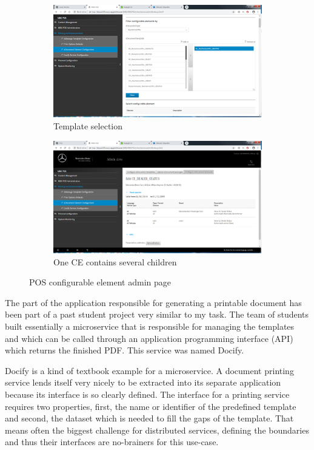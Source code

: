 \begin{figure}
  \begin{subfigure}[b]{0.5\linewidth}
    \includegraphics[width=\linewidth]{assets/pos-ce-config-1.png}
    \caption{Template selection}
    \label{fig:pos:a}
  \end{subfigure}
  \begin{subfigure}[b]{0.5\linewidth}
    \includegraphics[width=\linewidth]{assets/pos-ce-config-3.png}
    \caption{One CE contains several children}
    \label{fig:pos:b}
  \end{subfigure}
  \caption{POS configurable element admin page}
  \label{fig:pos}
\end{figure}

The part of the application responsible for generating a printable document has been part of a past student project very similar to my task. The team of students built essentially a microservice that is responsible for managing the templates and which can be called through an application programming interface (API) which returns the finished PDF. This service was named Docify.

Docify is a kind of textbook example for a microservice. A document printing service lends itself very nicely to be extracted into its separate application because its interface is so clearly defined. The interface for a printing service requires two properties, first, the name or identifier of the predefined template and second, the dataset which is needed to fill the gaps of the template. That means often the biggest challenge for distributed services, defining the boundaries and thus their interfaces are no-brainers for this use-case.

